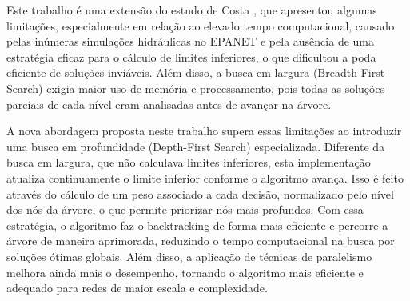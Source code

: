 Este trabalho é uma extensão do estudo de Costa \cite{Costa2015}, que apresentou algumas limitações, especialmente em relação ao elevado tempo computacional, causado pelas inúmeras simulações hidráulicas no EPANET e pela ausência de uma estratégia eficaz para o cálculo de limites inferiores, o que dificultou a poda eficiente de soluções inviáveis. Além disso, a busca em largura (Breadth-First Search) exigia maior uso de memória e processamento, pois todas as soluções parciais de cada nível eram analisadas antes de avançar na árvore.

A nova abordagem proposta neste trabalho supera essas limitações ao introduzir uma busca em profundidade (Depth-First Search) especializada. Diferente da busca em largura, que não calculava limites inferiores, esta implementação atualiza continuamente o limite inferior conforme o algoritmo avança. Isso é feito através do cálculo de um peso associado a cada decisão, normalizado pelo nível dos nós da árvore, o que permite priorizar nós mais profundos. Com essa estratégia, o algoritmo faz o backtracking de forma mais eficiente e percorre a árvore de maneira aprimorada, reduzindo o tempo computacional na busca por soluções ótimas globais. Além disso, a aplicação de técnicas de paralelismo melhora ainda mais o desempenho, tornando o algoritmo mais eficiente e adequado para redes de maior escala e complexidade.
